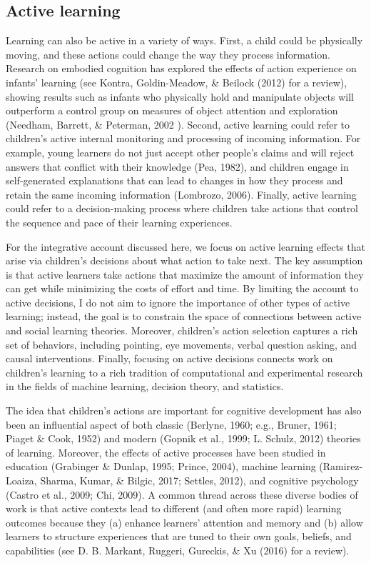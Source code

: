 \documentclass[oneside]{report}
\begin{document}
\subsection{Active learning}\label{active-learning}

Learning can also be active in a variety of ways. First, a child could
be physically moving, and these actions could change the way they
process information. Research on embodied cognition has explored the
effects of action experience on infants' learning (see Kontra,
Goldin-Meadow, \& Beilock (2012) for a review), showing results such as
infants who physically hold and manipulate objects will outperform a
control group on measures of object attention and exploration (Needham,
Barrett, \& Peterman, 2002 ). Second, active learning could refer to
children's active internal monitoring and processing of incoming
information. For example, young learners do not just accept other
people's claims and will reject answers that conflict with their
knowledge (Pea, 1982), and children engage in self-generated
explanations that can lead to changes in how they process and retain the
same incoming information (Lombrozo, 2006). Finally, active learning
could refer to a decision-making process where children take actions
that control the sequence and pace of their learning experiences.

For the integrative account discussed here, we focus on active learning
effects that arise via children's decisions about what action to take
next. The key assumption is that active learners take actions that
maximize the amount of information they can get while minimizing the
costs of effort and time. By limiting the account to active decisions, I
do not aim to ignore the importance of other types of active learning;
instead, the goal is to constrain the space of connections between
active and social learning theories. Moreover, children's action
selection captures a rich set of behaviors, including pointing, eye
movements, verbal question asking, and causal interventions. Finally,
focusing on active decisions connects work on children's learning to a
rich tradition of computational and experimental research in the fields
of machine learning, decision theory, and statistics.

The idea that children's actions are important for cognitive development
has also been an influential aspect of both classic (Berlyne, 1960;
e.g., Bruner, 1961; Piaget \& Cook, 1952) and modern (Gopnik et al.,
1999; L. Schulz, 2012) theories of learning. Moreover, the effects of
active processes have been studied in education (Grabinger \& Dunlap,
1995; Prince, 2004), machine learning (Ramirez-Loaiza, Sharma, Kumar, \&
Bilgic, 2017; Settles, 2012), and cognitive psychology (Castro et al.,
2009; Chi, 2009). A common thread across these diverse bodies of work is
that active contexts lead to different (and often more rapid) learning
outcomes because they (a) enhance learners' attention and memory and (b)
allow learners to structure experiences that are tuned to their own
goals, beliefs, and capabilities (see D. B. Markant, Ruggeri, Gureckis,
\& Xu (2016) for a review).
\end{document}
